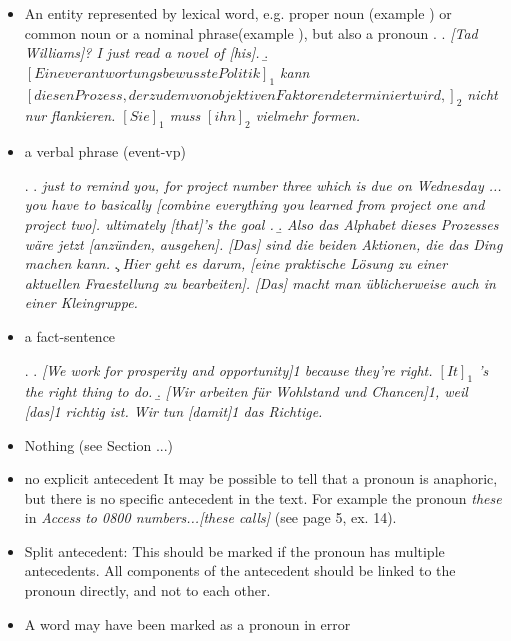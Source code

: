 \documentclass[a4paper]{article}
\begin{document}
\begin{itemize}
\item An entity represented by lexical word, e.g. proper noun (example \Next[a]) or common noun or a nominal phrase(example \Next[b]), but also a pronoun  
\ex. 
\a. {\sl [Tad Williams]? I just read a novel of [his].}
\b. {\sl \([Eine verantwortungsbewusste Politik]_1\) kann\\ \([diesen Prozess, der zudem von objektiven Faktoren determiniert wird,]_2\) nicht nur flankieren. \([Sie]_1\) muss \([ihn]_2\) vielmehr formen.}

\item a verbal phrase (event-vp)

\ex.
\a. {\sl just to remind you, for project number three which is due on Wednesday ... you have to basically [combine everything you learned from project one and project two]. ultimately [that]'s the goal .}
\b. {\sl Also das Alphabet dieses Prozesses wäre jetzt [anzünden, ausgehen]. [Das] sind die beiden Aktionen, die das Ding machen kann.}
\c. {\sl Hier geht es darum, [eine praktische Lösung zu einer aktuellen Fraestellung zu bearbeiten]. [Das] macht man üblicherweise auch in einer Kleingruppe.}

\item a fact-sentence

\ex.
\a.  {\sl  [We work for prosperity and opportunity]1 because they’re right. \([It]_1\) 's the right thing to do.}
\b. {\sl [Wir arbeiten für Wohlstand und Chancen]1, weil [das]1 richtig ist. Wir tun [damit]1 das Richtige.}

\item Nothing (see Section ...)
\item  no explicit antecedent It may be possible to tell that a pronoun is anaphoric, but there is no specific antecedent in the text. For example the pronoun {\sl these} in {\sl Access
to 0800 numbers...[these calls]} (see page 5, ex. 14).

\item Split antecedent: This should be marked if the pronoun has multiple antecedents. All components
of the antecedent should be linked to the pronoun directly, and not to each other.

\item A word may have been marked as a pronoun in error 
\end{itemize}
\end{document}
